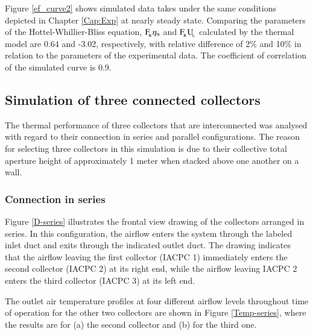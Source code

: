 
Figure \ref{ef_curve2} shows simulated data takes under the same conditions depicted in Chapter \ref{Cap:Exp} at nearly steady state. Comparing the parameters of the Hottel-Whillier-Bliss equation, $\rm{F_{\!_R}}\eta_{\rm{o}}$ and $\rm{ F_{\!_R}{U_{\!_L}}}$ calculated by the thermal model are 0.64 and -3.02, respectively, with relative difference of 2\% and 10\% in relation to the parameters of the experimental data. The coefficient of correlation  of the simulated curve is 0.9.


\subsection{Simulation of three connected collectors}

The thermal performance of three collectors that are interconnected was analysed with regard to their connection in series and parallel configurations. The reason for selecting three collectors in this simulation is due to their collective total aperture height of approximately 1 meter when stacked above one another on a wall.

\subsubsection{Connection in series}

Figure \ref{D-series} illustrates the frontal view drawing of the collectors arranged in series. In this configuration, the airflow enters the system through the labeled inlet duct and exits through the indicated outlet duct. The drawing indicates that the airflow leaving the first collector (IACPC 1) immediately enters the second collector (IACPC 2) at its right end, while the airflow leaving IACPC 2 enters the third collector (IACPC 3) at its left end.


The outlet air temperature profiles at four different airflow levels throughout time of operation for the other two collectors are shown in Figure \ref{Temp-series}, where the results are for (a) the second collector and (b) for the third one.

